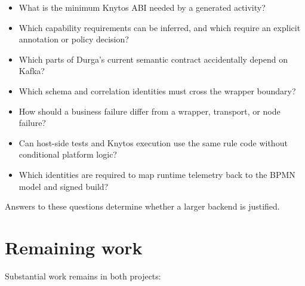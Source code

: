 \begin{itemize}
    \item What is the minimum Knytos ABI needed by a generated activity?
    \item Which capability requirements can be inferred, and which require an
        explicit annotation or policy decision?
    \item Which parts of Durga's current semantic contract accidentally depend
        on Kafka?
    \item Which schema and correlation identities must cross the wrapper
        boundary?
    \item How should a business failure differ from a wrapper, transport, or
        node failure?
    \item Can host-side tests and Knytos execution use the same rule code
        without conditional platform logic?
    \item Which identities are required to map runtime telemetry back to the
        BPMN model and signed build?
\end{itemize}

Answers to these questions determine whether a larger backend is justified.

\section{Remaining work}

Substantial work remains in both projects:

